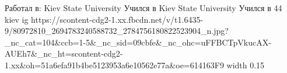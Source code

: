  
 
 
 
 

\par
Работал в: Kiev State University
Учился в Kiev State University
Учился в 44 kiev
\ifcmt
  ig https://scontent-cdg2-1.xx.fbcdn.net/v/t1.6435-9/80972810_2694783240588732_2784756180822523904_n.jpg?_nc_cat=104&ccb=1-5&_nc_sid=09cbfe&_nc_ohc=uFFBCTpVkucAX-AUEh7&_nc_ht=scontent-cdg2-1.xx&oh=51a6efa91b4be5123953a6e10562e77a&oe=614163F9
  width 0.15
\fi

